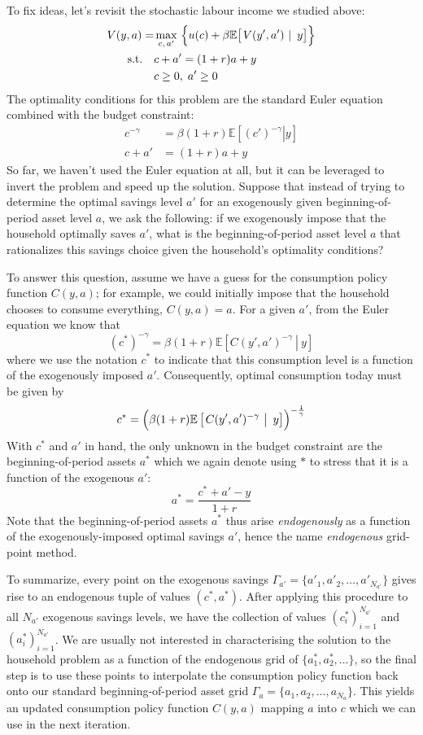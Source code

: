 \documentclass{scrartcl}
\begin{document}
To fix ideas, let's revisit the stochastic labour income we studied
above: \[
\begin{aligned}
V(y,a) = &\max_{c,\,a'}~\Bigl\{ u(c)
    + \beta \mathbb{E}\bigl[\left.V(y',a')~\right|~ y\bigr] \Bigr\} \\
    \text{s.t.} \quad &c + a' = (1+r)a  + y \\
    & c \geq 0,\; a' \geq 0
\end{aligned}
\] The optimality conditions for this problem are the standard Euler
equation combined with the budget constraint: \[
\begin{aligned}
c^{-\gamma} &= \beta (1+r) \mathbb{E}\left[\left.(c')^{-\gamma}\right| y\right] \\
c + a' &= (1+r)a + y
\end{aligned}
\] So far, we haven't used the Euler equation at all, but it can be
leveraged to invert the problem and speed up the solution. Suppose that
instead of trying to determine the optimal savings level \(a'\) for an
exogenously given beginning-of-period asset level \(a\), we ask the
following: if we exogenously impose that the household optimally saves
\(a'\), what is the beginning-of-period asset level \(a\) that
rationalizes this savings choice given the household's optimality
conditions?

    To answer this question, assume we have a guess for the consumption
policy function \(C(y,a)\); for example, we could initially impose that
the household chooses to consume everything, \ie \(C(y,a) = a\). For a
given \(a'\), from the Euler equation we know that \[
(c^*)^{-\gamma} = \beta (1+r) \mathbb{E}\left[ \left.C(y',a')^{-\gamma}~\right|~y \right]
\] where we use the notation \(c^*\) to indicate that this consumption
level is a function of the exogenously imposed \(a'\). Consequently,
optimal consumption today must be given by \[
c^* = \Bigl( \beta (1+r) \mathbb{E}\left[ \left.C(y',a')^{-\gamma}~\right|~y \right] \Bigr)^{-\frac{1}{\gamma}}
\] With \(c^*\) and \(a'\) in hand, the only unknown in the budget
constraint are the beginning-of-period assets \(a^*\) which we again
denote using \(*\) to stress that it is a function of the exogenous
\(a'\): \[
a^* = \frac{c^* + a' - y}{1+r}
\] Note that the beginning-of-period assets \(a^*\) thus arise
\emph{endogenously} as a function of the exogenously-imposed optimal
savings \(a'\), hence the name \emph{endogenous} grid-point method.

To summarize, every point on the exogenous savings
\(\Gamma_{a'} = \{a'_1, a'_2, \dots, a'_{N_{a'}}\}\) gives rise to an
endogenous tuple of values \((c^*, a^*)\). After applying this procedure
to all \(N_{a'}\) exogenous savings levels, we have the collection of
values \((c_i^*)_{i=1}^{N_{a'}}\) and \((a_i^*)_{i=1}^{N_{a'}}\). We are
usually not interested in characterising the solution to the household
problem as a function of the endogenous grid of
\(\{a^*_1,a^*_2,\dots\}\), so the final step is to use these points to
interpolate the consumption policy function back onto our standard
beginning-of-period asset grid
\(\Gamma_a = \{a_1, a_2, \dots, a_{N_a}\}\). This yields an updated
consumption policy function \(C(y,a)\) mapping \(a\) into \(c\) which we
can use in the next iteration.
\end{document}
